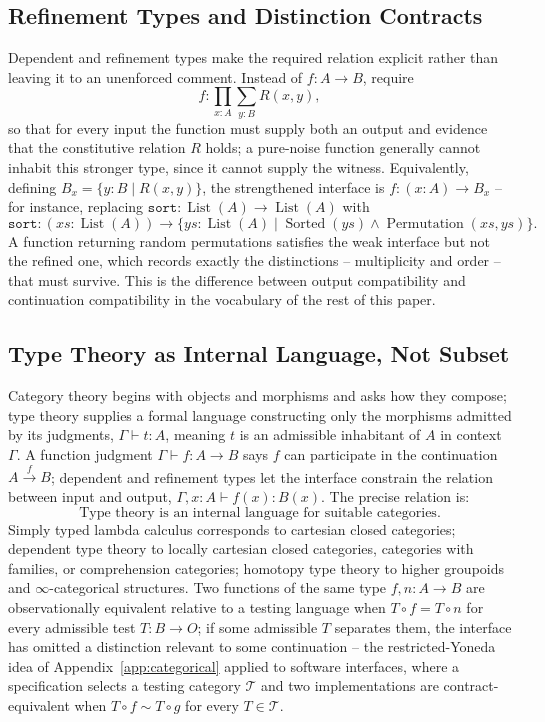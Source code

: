 \documentclass[11pt]{article}
\begin{document}
\subsection{Refinement Types and Distinction Contracts}

Dependent and refinement types make the required relation explicit rather than leaving it to an unenforced comment. Instead of $f : A \to B$, require
\[
f : \prod_{x:A} \sum_{y:B} R(x,y),
\]
so that for every input the function must supply both an output and evidence that the constitutive relation $R$ holds; a pure-noise function generally cannot inhabit this stronger type, since it cannot supply the witness. Equivalently, defining $B_x = \{y : B \mid R(x,y)\}$, the strengthened interface is $f : (x:A) \to B_x$ -- for instance, replacing $\texttt{sort} : \operatorname{List}(A) \to \operatorname{List}(A)$ with
\[
\texttt{sort} : (xs : \operatorname{List}(A)) \to \{ys : \operatorname{List}(A) \mid \operatorname{Sorted}(ys) \wedge \operatorname{Permutation}(xs,ys)\}.
\]
A function returning random permutations satisfies the weak interface but not the refined one, which records exactly the distinctions -- multiplicity and order -- that must survive. This is the difference between output compatibility and continuation compatibility in the vocabulary of the rest of this paper.

\subsection{Type Theory as Internal Language, Not Subset}

Category theory begins with objects and morphisms and asks how they compose; type theory supplies a formal language constructing only the morphisms admitted by its judgments, $\Gamma \vdash t : A$, meaning $t$ is an admissible inhabitant of $A$ in context $\Gamma$. A function judgment $\Gamma \vdash f : A \to B$ says $f$ can participate in the continuation $A \xrightarrow{f} B$; dependent and refinement types let the interface constrain the relation between input and output, $\Gamma, x{:}A \vdash f(x) : B(x)$. The precise relation is:
\[
\text{Type theory is an internal language for suitable categories.}
\]
Simply typed lambda calculus corresponds to cartesian closed categories; dependent type theory to locally cartesian closed categories, categories with families, or comprehension categories; homotopy type theory to higher groupoids and $\infty$-categorical structures. Two functions of the same type $f, n : A \to B$ are observationally equivalent relative to a testing language when $T \circ f = T \circ n$ for every admissible test $T : B \to O$; if some admissible $T$ separates them, the interface has omitted a distinction relevant to some continuation -- the restricted-Yoneda idea of Appendix~\ref{app:categorical} applied to software interfaces, where a specification selects a testing category $\mathcal{T}$ and two implementations are contract-equivalent when $T \circ f \sim T \circ g$ for every $T \in \mathcal{T}$.
\end{document}
